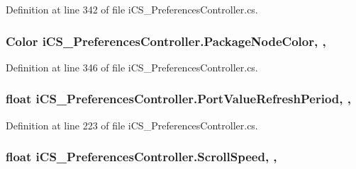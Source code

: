Definition at line 342 of file i\+C\+S\+\_\+\+Preferences\+Controller.\+cs.

\hypertarget{classi_c_s___preferences_controller_ae2e309bcea7bc1e0cd1e98f77d9c8247}{
\subsubsection[{Package\+Node\+Color}]{\setlength{\rightskip}{0pt plus 5cm}Color i\+C\+S\+\_\+\+Preferences\+Controller.\+Package\+Node\+Color\hspace{0.3cm}{\ttfamily [static]}, {\ttfamily [get]}, {\ttfamily [set]}}}\label{classi_c_s___preferences_controller_ae2e309bcea7bc1e0cd1e98f77d9c8247}


Definition at line 346 of file i\+C\+S\+\_\+\+Preferences\+Controller.\+cs.

\hypertarget{classi_c_s___preferences_controller_a7c86db8d6d0ace917e443e90a3ad0b02}{
\subsubsection[{Port\+Value\+Refresh\+Period}]{\setlength{\rightskip}{0pt plus 5cm}float i\+C\+S\+\_\+\+Preferences\+Controller.\+Port\+Value\+Refresh\+Period\hspace{0.3cm}{\ttfamily [static]}, {\ttfamily [get]}, {\ttfamily [set]}}}\label{classi_c_s___preferences_controller_a7c86db8d6d0ace917e443e90a3ad0b02}


Definition at line 223 of file i\+C\+S\+\_\+\+Preferences\+Controller.\+cs.

\hypertarget{classi_c_s___preferences_controller_ad3de9b6d316d11ad5223c2a0a747d730}{
\subsubsection[{Scroll\+Speed}]{\setlength{\rightskip}{0pt plus 5cm}float i\+C\+S\+\_\+\+Preferences\+Controller.\+Scroll\+Speed\hspace{0.3cm}{\ttfamily [static]}, {\ttfamily [get]}, {\ttfamily [set]}}}\label{classi_c_s___preferences_controller_ad3de9b6d316d11ad5223c2a0a747d730}


